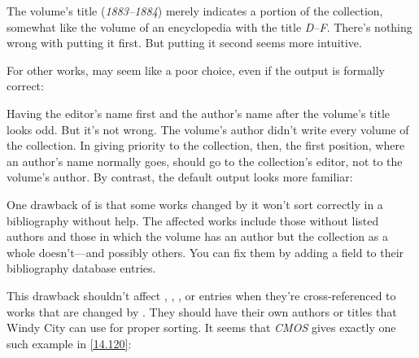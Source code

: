 \documentclass[11pt,letterpaper,oneside]{article}
\begin{document}
\begin{citebib}
\item \cite*{james1963.5}
\end{citebib}

\noindent The volume's title (\textit{1883--1884}) merely indicates a
portion of the collection, somewhat like the volume of an encyclopedia
with the title \textit{D–F}. There's nothing wrong with putting it
first. But putting it second seems more intuitive.

For other works,  may seem like a poor choice, even if
the output is formally correct:

\begin{citebib}
\item \cite{barrows1959}
\end{citebib}

\noindent Having the editor's name first and the author's name after
the volume's title looks odd. But it's not wrong. The volume's author
didn't write every volume of the collection. In giving priority to the
collection, then, the first position, where an author's name normally
goes, should go to the collection's editor, not to the volume's
author. By contrast, the default output looks more familiar:

\begin{citebib}
\item \cite{barrows1959}
\end{citebib}

One drawback of  is that some works changed by it won't
sort correctly in a bibliography without help. The affected works
include those without listed authors and those in which the volume has
an author but the collection as a whole doesn't---and possibly others.
You can fix them by adding a  field to their
bibliography database entries.

This drawback shouldn't affect ,
, , or 
entries when they're cross-referenced to works that are changed by
. They should have their own authors or titles that Windy
City can use for proper sorting. It seems that \textit{CMOS} gives
exactly one such example in \ref{14.120}:

\begin{citebib}
\item \cite[169--71]{king2014}
\item \cite[170]{king2014}
\end{citebib}
\end{document}
